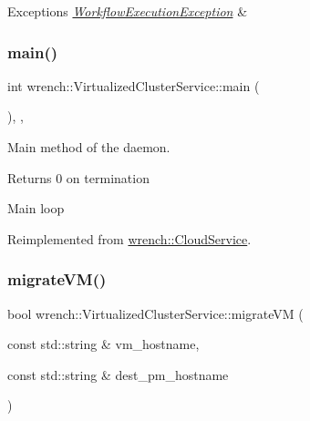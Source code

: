 \begin{DoxyExceptions}{Exceptions}
{\em \hyperlink{classwrench_1_1_workflow_execution_exception}{Workflow\+Execution\+Exception}} & \\
\hline
\end{DoxyExceptions}
\mbox{\label{classwrench_1_1_virtualized_cluster_service_aa900061ac9077df089dfe760c921ec27}} 
\subsubsection{\texorpdfstring{main()}{main()}}
{\footnotesize\ttfamily int wrench\+::\+Virtualized\+Cluster\+Service\+::main (\begin{DoxyParamCaption}{ }\end{DoxyParamCaption})\hspace{0.3cm}{\ttfamily [override]}, {\ttfamily [protected]}, {\ttfamily [virtual]}}



Main method of the daemon. 

\begin{DoxyReturn}{Returns}
0 on termination 
\end{DoxyReturn}
Main loop 

Reimplemented from \hyperlink{classwrench_1_1_cloud_service_a95f0cc4adf4ad0d33cb757f24b78e9ff}{wrench\+::\+Cloud\+Service}.

\mbox{\label{classwrench_1_1_virtualized_cluster_service_a0a81357e7af9b42bbb7b376c56a90611}} 
\subsubsection{\texorpdfstring{migrate\+V\+M()}{migrateVM()}}
{\footnotesize\ttfamily bool wrench\+::\+Virtualized\+Cluster\+Service\+::migrate\+VM (\begin{DoxyParamCaption}\item[{const std\+::string \&}]{vm\+\_\+hostname,  }\item[{const std\+::string \&}]{dest\+\_\+pm\+\_\+hostname }\end{DoxyParamCaption})\hspace{0.3cm}{\ttfamily [virtual]}}



